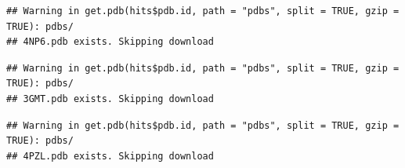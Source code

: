 \documentclass[
]{article}
\begin{document}
\begin{verbatim}
## Warning in get.pdb(hits$pdb.id, path = "pdbs", split = TRUE, gzip = TRUE): pdbs/
## 4NP6.pdb exists. Skipping download
\end{verbatim}

\begin{verbatim}
## Warning in get.pdb(hits$pdb.id, path = "pdbs", split = TRUE, gzip = TRUE): pdbs/
## 3GMT.pdb exists. Skipping download
\end{verbatim}

\begin{verbatim}
## Warning in get.pdb(hits$pdb.id, path = "pdbs", split = TRUE, gzip = TRUE): pdbs/
## 4PZL.pdb exists. Skipping download
\end{verbatim}

\begin{verbatim}

\end{verbatim}
\end{document}
